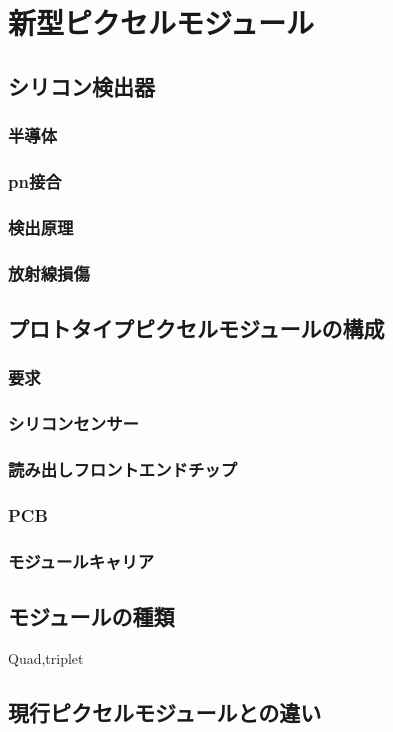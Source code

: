 \chapter{新型ピクセルモジュール}

\section{シリコン検出器}
\subsection{半導体}
\subsection{pn接合}
\subsection{検出原理}
\subsection{放射線損傷}

\section{プロトタイプピクセルモジュールの構成}
\subsection{要求}
\subsection{シリコンセンサー}
\subsection{読み出しフロントエンドチップ}
\subsection{PCB}
\subsection{モジュールキャリア}

\section{モジュールの種類}
Quad,triplet

\section{現行ピクセルモジュールとの違い}
